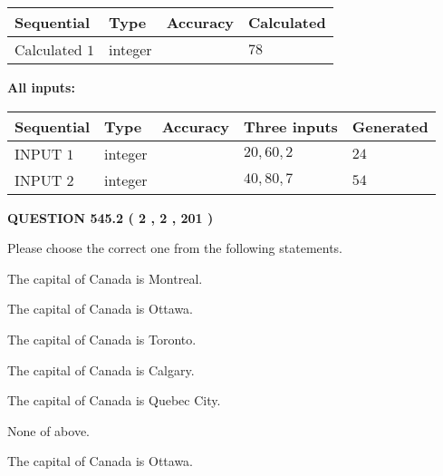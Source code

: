 \documentclass[12pt]{article}
\begin{document}
   
  
  
\noindent\begin{tabular}{|l|l|l|l|}
\hline
 Sequential & Type & Accuracy & Calculated \\ 
\hline
 
 
  Calculated $  1 $ & integer &  & 
  $ 78 $ 
 \\  \hline  
 \end{tabular}
   
   
   
   
\noindent\vspace{0.1in}\hspace{-0.08in} {\textbf{\Large{All inputs: }}}
   
   
  
  
\noindent\begin{tabular}{|l|l|l|l|l|}
\hline
 Sequential & Type & Accuracy & Three inputs & Generated \\ 
\hline
 
 
  INPUT $  1 $ & integer &  & $
 20
 , 
 60
 , 
 2
 $ & $ 24 $ 
 \\  \hline  
 
 
  INPUT $  2 $ & integer &  & $
 40
 , 
 80
 , 
 7
 $ & $ 54 $ 
 \\  \hline  
 \end{tabular}
   
   
  
\vspace{0.2in}
  
{\textbf{\Large{QUESTION
545.2 
 ( 2 , 2 , 201 )
}}}
  
  
Please choose the correct one from the following statements.
 
 
The capital of Canada is Montreal.
 
 
The capital of Canada is Ottawa.
 
 
The capital of Canada is Toronto.
 
 
The capital of Canada is Calgary.
 
 
The capital of Canada is Quebec City.
 
 
 None of above.
 
 
\noindent{}
 
 
The capital of Canada is Ottawa.
 
\end{document}
